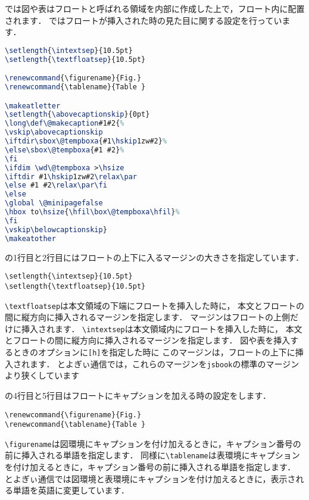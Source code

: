 {\pLaTeX}では図や表はフロートと呼ばれる領域を内部に作成した上で，フロート内に配置されます．
ではフロートが挿入された時の見た目に関する設定を行っています．
\begin{lstlisting}[caption = フロートついての設定, label = list:float, language = tex]
\setlength{\intextsep}{10.5pt}
\setlength{\textfloatsep}{10.5pt}

\renewcommand{\figurename}{Fig.}
\renewcommand{\tablename}{Table }

\makeatletter
\setlength{\abovecaptionskip}{0pt}
\long\def\@makecaption#1#2{%
\vskip\abovecaptionskip
\iftdir\sbox\@tempboxa{#1\hskip1zw#2}%
\else\sbox\@tempboxa{#1 #2}%
\fi
\ifdim \wd\@tempboxa >\hsize
\iftdir #1\hskip1zw#2\relax\par
\else #1 #2\relax\par\fi
\else
\global \@minipagefalse
\hbox to\hsize{\hfil\box\@tempboxa\hfil}%
\fi
\vskip\belowcaptionskip}
\makeatother
\end{lstlisting}


の1行目と2行目にはフロートの上下に入るマージンの大きさを指定しています．
\begin{verbatim}
\setlength{\intextsep}{10.5pt}
\setlength{\textfloatsep}{10.5pt}
\end{verbatim}

\verb|\textfloatsep|は本文領域の下端にフロートを挿入した時に，
本文とフロートの間に縦方向に挿入されるマージンを指定します．
マージンはフロートの上側だけに挿入されます．
\verb|\intextsep|は本文領域内にフロートを挿入した時に，
本文とフロートの間に縦方向に挿入されるマージンを指定します．
図や表を挿入するときのオプションに\texttt{[h]}を指定した時に
このマージンは，フロートの上下に挿入されます．
とよぎぃ通信では，これらのマージンを\texttt{jsbook}の標準のマージンより狭くしています

の4行目と5行目はフロートにキャプションを加える時の設定をします．
\begin{verbatim}
\renewcommand{\figurename}{Fig.}
\renewcommand{\tablename}{Table }
\end{verbatim}

\verb|\figurename|は図環境にキャプションを付け加えるときに，キャプション番号の前に挿入される単語を指定します．
同様に\verb|\tablename|は表環境にキャプションを付け加えるときに，キャプション番号の前に挿入される単語を指定します．
とよぎぃ通信では図環境と表環境にキャプションを付け加えるときに，表示される単語を英語に変更しています．

